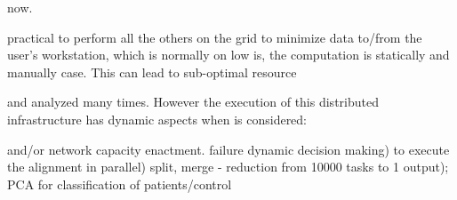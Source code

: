 \documentclass[times]{cpeauth}
\begin{document}
now.


practical to perform all the others on the grid to minimize data %
to/from the user's workstation, which is normally on low %
is, the computation is statically and manually %
case. This can lead to sub-optimal resource %

and analyzed many times. However the execution of this %
distributed infrastructure has dynamic aspects when %
is considered:

and/or network capacity
enactment.
%
%
%
failure
dynamic decision making) to execute the alignment in parallel)
split, merge - reduction from 10000 tasks to 1 output); PCA for classification
of patients/control
%
%
%
%
\end{document}
